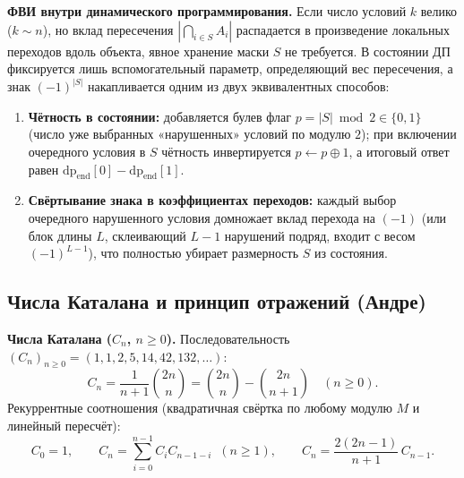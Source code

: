 \documentclass[10pt,a4paper]{article}
\renewcommand{\ge}{\geqslant}
\begin{document}
\textbf{ФВИ внутри динамического программирования.} Если число условий $k$ велико ($k \sim n$), но вклад пересечения $\left|\bigcap_{i \in S} A_i\right|$ распадается в произведение локальных переходов вдоль объекта, явное хранение маски $S$ не требуется. В состоянии ДП фиксируется лишь вспомогательный параметр, определяющий вес пересечения, а знак $(-1)^{|S|}$ накапливается одним из двух эквивалентных способов:
\begin{enumerate}
  \item \textbf{Чётность в состоянии:} добавляется булев флаг $p = |S| \bmod 2 \in \{0, 1\}$ (число уже выбранных «нарушенных» условий по модулю $2$); при включении очередного условия в $S$ чётность инвертируется $p \leftarrow p \oplus 1$, а итоговый ответ равен $\mathrm{dp}_{\text{end}}[0] - \mathrm{dp}_{\text{end}}[1]$.
  \item \textbf{Свёртывание знака в коэффициентах переходов:} каждый выбор очередного нарушенного условия домножает вклад перехода на $(-1)$ (или блок длины $L$, склеивающий $L - 1$ нарушений подряд, входит с весом $(-1)^{L-1}$), что полностью убирает размерность $S$ из состояния.
\end{enumerate}

\subsection{Числа Каталана и принцип отражений (Андре)}

\textbf{Числа Каталана ($C_n$, $n \ge 0$).} Последовательность $(C_n)_{n \ge 0} = (1, 1, 2, 5, 14, 42, 132, \ldots)$:
\[
  C_n = \frac{1}{n + 1}\binom{2n}{n} = \binom{2n}{n} - \binom{2n}{n + 1} \quad (n \ge 0).
\]
Рекуррентные соотношения (квадратичная свёртка по любому модулю $M$ и линейный пересчёт):
\[
  C_0 = 1, \qquad C_n = \sum_{i=0}^{n-1} C_i C_{n - 1 - i} \;\;(n \ge 1), \qquad
  C_n = \frac{2(2n - 1)}{n + 1}\, C_{n - 1}.
\]
\end{document}
